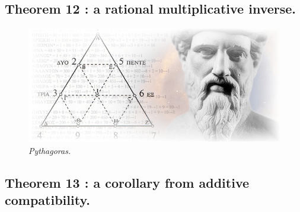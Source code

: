 \documentclass[preview]{standalone}
\begin{document}
\subsection[A rational multiplicative inverse.]{\color{section} Theorem 12 \color{black} : a rational multiplicative inverse.}

\begin{figure}[h!]
    \centering
    \includegraphics[width=13cm]{../resources/jpg/1.6.introduction.to.proofs/pythagoras.jpg}
    \caption*{\emph{Pythagoras.}}
\end{figure}


\subsection[A corollary from additive compatibility.]{\color{section} Theorem 13 \color{black} : a corollary from additive compatibility.}

\pagebreak


\end{document}
